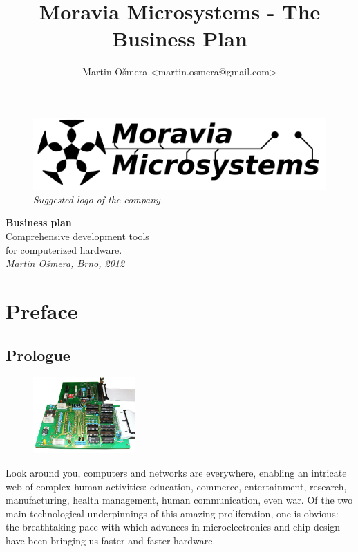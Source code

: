 \documentclass[a4paper,twoside,15pt]{book}
\title{Moravia Microsystems - The Business Plan}
\author{Martin Ošmera <martin.osmera@gmail.com>}
\begin{document}
\begin{titlepage}
	\begin{figure}[ht!]
		\centering{}
		\includegraphics[width=.9\textwidth]{images/Moravia_Microsystems.png}
		\caption{\textit{Suggested logo of the company.}}
	\end{figure}
	\begin{center}
		\fontsize{35.83pt}{60pt} \selectfont{}
		\textbf{Business plan}
		\\[2cm]
		\fontsize{25pt}{30pt} \selectfont{}
		Comprehensive development tools\\
		for computerized hardware.
		\\[1cm]
		\fontsize{14.4pt}{20pt} \selectfont{}
		\textit{Martin Ošmera, Brno, 2012}
	\end{center}
\end{titlepage}

\tableofcontents

\chapter{Preface}
	\section{Prologue}
		\begin{figure}
			\centering{}
			\includegraphics[width=110pt]{images/some_board_0.jpg}
		\end{figure}
		Look around you, computers and networks are everywhere, enabling an intricate web of complex human activities: education, commerce, entertainment, research, manufacturing, health management, human communication, even war. Of the two main technological underpinnings of this amazing proliferation, one is obvious: the breathtaking pace with which advances in microelectronics and chip design have been bringing us faster and faster hardware.
\end{document}
